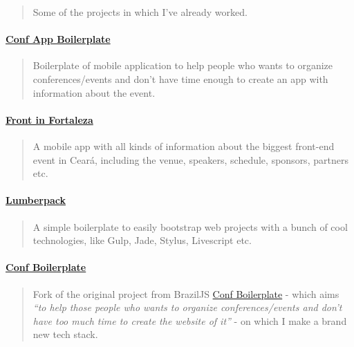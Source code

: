\documentclass[]{article}
\let\oldparagraph\paragraph
\renewcommand{\paragraph}[1]{\oldparagraph{#1}\mbox{}}
\begin{document}
\begin{quote}
Some of the projects in which I've already worked.
\end{quote}

\paragraph{\texorpdfstring{\href{https://github.com/devevents/conf-app-boilerplate}{Conf
App Boilerplate}}{Conf App Boilerplate}}\label{conf-app-boilerplate}

\begin{quote}
Boilerplate of mobile application to help people who wants to organize
conferences/events and don't have time enough to create an app with
information about the event.
\end{quote}

\paragraph{\texorpdfstring{\href{https://play.google.com/store/apps/details?id=com.devevents.frontinfortaleza}{Front
in Fortaleza}}{Front in Fortaleza}}\label{front-in-fortaleza}

\begin{quote}
A mobile app with all kinds of information about the biggest front-end
event in Ceará, including the venue, speakers, schedule, sponsors,
partners etc.
\end{quote}

\paragraph{\texorpdfstring{\href{https://github.com/mabrasil/lumberpack}{Lumberpack}}{Lumberpack}}\label{lumberpack}

\begin{quote}
A simple boilerplate to easily bootstrap web projects with a bunch of
cool technologies, like Gulp, Jade, Stylus, Livescript etc.
\end{quote}

\paragraph{\texorpdfstring{\href{https://github.com/mabrasil/conf-boilerplate}{Conf
Boilerplate}}{Conf Boilerplate}}\label{conf-boilerplate}

\begin{quote}
Fork of the original project from BrazilJS
\href{https://github.com/braziljs/conf-boilerplate}{Conf Boilerplate} -
which aims \emph{``to help those people who wants to organize
conferences/events and don't have too much time to create the website of
it''} - on which I make a brand new tech stack.
\end{quote}
\end{document}

